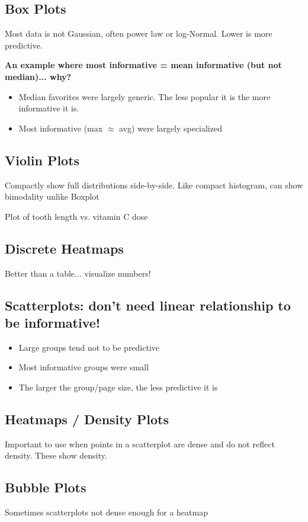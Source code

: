 \documentclass[11pt]{article}
\theoremstyle{definition}
\begin{document}
\subsection{Box Plots}
Most data is not Gaussian, often power law or log-Normal. Lower is more predictive.

\textbf{An example where most informative = mean
informative (but not median)... why?}

\begin{itemize}
  \item Median favorites were largely generic. The less popular it is the more informative it is.
  \item Most informative (max $\approx$ avg) were largely specialized
\end{itemize}
\subsection{Violin Plots}
Compactly show full distributions side-by-side. Like compact histogram, can show bimodality unlike Boxplot

Plot of tooth length vs. vitamin C dose

\subsection{Discrete Heatmaps}
Better than a table... visualize numbers!

\subsection{Scatterplots: don’t need linear relationship to
be informative!}
\begin{itemize}
  \item Large groups tend not to be predictive
  \item Most informative groups were small
  \item The larger the group/page size, the less predictive it is
\end{itemize}

\subsection{Heatmaps / Density Plots}

Important to use when points in a scatterplot
are dense and do not reflect density. These show density.

\subsection{Bubble Plots}
Sometimes scatterplots not
dense enough for a heatmap
\end{document}
